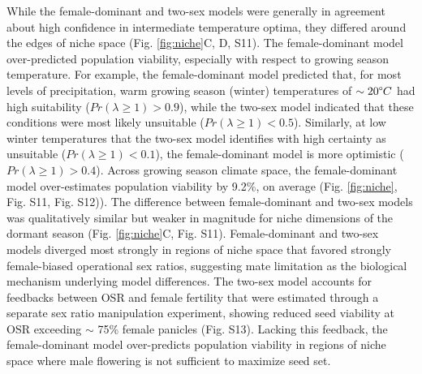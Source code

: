 \documentclass[9pt,twocolumn,twoside,lineno]{pnas-new}
\newcommand{\revise}[1]{{\color{Mahogany}{#1}}}
\begin{document}
While the female-dominant and two-sex models were generally in agreement about high confidence in intermediate temperature optima, they differed around the edges of niche space (Fig. \ref{fig:niche}C, D, S11). 
The female-dominant model over-predicted population viability, especially with respect to growing season temperature. 
For example, the female-dominant model predicted that, for most levels of precipitation, warm growing season (winter) temperatures of $\sim 20\degree C$ had high suitability ($Pr(\lambda \ge 1) > 0.9$), while the two-sex model indicated that these conditions were most likely unsuitable ($Pr(\lambda \ge 1) < 0.5$). 
Similarly, at low winter temperatures that the two-sex model identifies with high certainty as unsuitable ($Pr(\lambda \ge 1) < 0.1$), the female-dominant model is more optimistic ($Pr(\lambda \ge 1) > 0.4$). 
Across growing season climate space, the female-dominant model over-estimates population viability by 9.2\%, on average (Fig. \ref{fig:niche}\revise{\linelabel{panelfig3} E, F}, Fig. S11, Fig. S12)). 
The difference between female-dominant and two-sex models was qualitatively similar but weaker in magnitude for niche dimensions of the dormant season (Fig. \ref{fig:niche}C, Fig. S11). 
Female-dominant and two-sex models diverged most strongly in regions of niche space that favored strongly female-biased operational sex ratios, suggesting mate limitation as the biological mechanism underlying model differences. 
The two-sex model accounts for feedbacks between OSR and female fertility that were estimated through a separate sex ratio manipulation experiment, showing reduced seed viability at OSR exceeding $\sim$ 75\% female panicles (Fig. S13).
Lacking this feedback, the female-dominant model over-predicts population viability in regions of niche space where male flowering is not sufficient to maximize seed set. 
\end{document}
